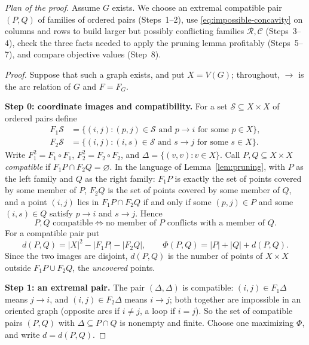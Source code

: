 \documentclass[11pt]{article}
\theoremstyle{remark}
\newcommand{\abs}[1]{\lvert #1\rvert}
\newcommand{\Step}[1]{\par\medskip\noindent\textbf{#1}\enspace}
\newcommand{\cR}{\mathcal R}
\newcommand{\cC}{\mathcal C}
\begin{document}
\emph{Plan of the proof.} Assume $G$ exists. We choose an extremal compatible
pair $(P,Q)$ of families of ordered pairs (Steps~1--2), use
\eqref{eq:impossible-concavity} on columns and rows to build larger but
possibly conflicting families $\cR,\cC$ (Steps~3--4), check the three facts
needed to apply the pruning lemma profitably (Steps~5--7), and compare
objective values (Step~8).

\begin{proof}
Suppose that such a graph exists, and put $X=V(G)$; throughout, $\to$ is the
arc relation of $G$ and $F=F_G$.

\Step{Step 0: coordinate images and compatibility.}
For a set $\mathcal S\subseteq X\times X$ of ordered pairs define
\[
 \begin{aligned}
 F_1\mathcal S&=\{(i,j): (p,j)\in \mathcal S\text{ and }p\to i
                     \text{ for some }p\in X\},\\
 F_2\mathcal S&=\{(i,j): (i,s)\in \mathcal S\text{ and }s\to j
                     \text{ for some }s\in X\}.
 \end{aligned}
\]
Write $F_1^2=F_1\circ F_1$, $F_2^2=F_2\circ F_2$, and
$\Delta=\{(v,v):v\in X\}$. Call $P,Q\subseteq X\times X$ \emph{compatible}
if $F_1P\cap F_2Q=\varnothing$. In the language of Lemma~\ref{lem:pruning},
with $P$ as the left family and $Q$ as the right family: $F_1P$ is exactly
the set of points covered by some member of $P$, $F_2Q$ is the set of points
covered by some member of $Q$, and a point $(i,j)$ lies in $F_1P\cap F_2Q$
if and only if some $(p,j)\in P$ and some $(i,s)\in Q$ satisfy $p\to i$ and
$s\to j$. Hence
\begin{equation}\label{eq:compatible-iff}
 P,Q\text{ compatible}\iff\text{no member of }P\text{ conflicts with a
 member of }Q .
\end{equation}
For a compatible pair put
\[
 d(P,Q)=\abs{X}^2-\abs{F_1P}-\abs{F_2Q},
 \qquad \Phi(P,Q)=\abs P+\abs Q+d(P,Q).
\]
Since the two images are disjoint, $d(P,Q)$ is the number of points of
$X\times X$ outside $F_1P\cup F_2Q$, the \emph{uncovered} points.

\Step{Step 1: an extremal pair.}
The pair $(\Delta,\Delta)$ is compatible: $(i,j)\in F_1\Delta$ means
$j\to i$, and $(i,j)\in F_2\Delta$ means $i\to j$; both together are
impossible in an oriented graph (opposite arcs if $i\ne j$, a loop if
$i=j$). So the set of compatible pairs $(P,Q)$ with
$\Delta\subseteq P\cap Q$ is nonempty and finite. Choose one maximizing
$\Phi$, and write $d=d(P,Q)$.


\end{proof}
\end{document}
